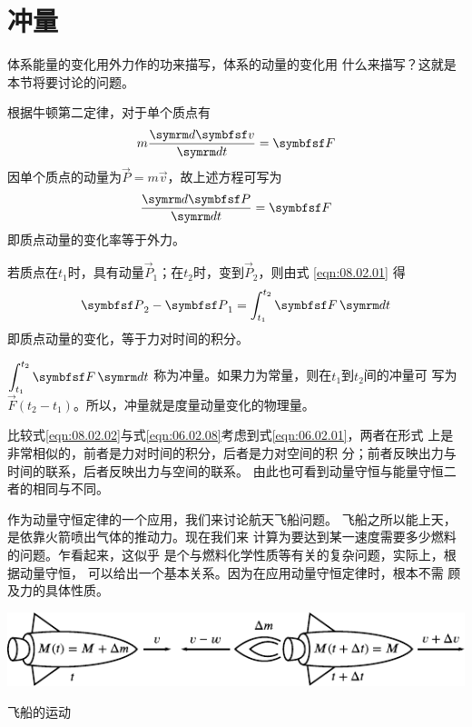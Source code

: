 \section[冲量]{冲\qquad 量}\label{sec:08.02}

体系能量的变化用外力作的功来描写，体系的动量的变化用
什么来描写？这就是本节将要讨论的问题。

根据牛顿第二定律，对于单个质点有
\begin{equation*}
  m \frac { \dif \vec{v} } { \dif t } = \vec{F}
\end{equation*}
因单个质点的动量为$  \vec{P} = m \vec{v}   $，故上述方程可写为
\begin{equation}\label{eqn:08.02.01}
  \frac { \dif \vec{P} } { \dif t } = \vec{F}
\end{equation}
即质点动量的变化率等于外力。

若质点在$  t _ { 1 }   $时，具有动量$\vec{P} _ 1$；在$ t _ { 2 } $时，变到$\vec{P} _ 2$，则由式 \eqref{eqn:08.02.01}
得
\begin{equation}\label{eqn:08.02.02}
  \vec{P} _ { 2 } - \vec{P} _ { 1 } = \int _ { t _ { 1 } } ^ { t _ { 2 } } \vec{F} \dif t
\end{equation}
即质点动量的变化，等于力对时间的积分。

$ \displaystyle \int _ { t _ { 1 } } ^ { t _ { 2 } } \vec{F} \dif t $
称为冲量。如果力为常量，则在$ t_1 $到$ t_2 $间的冲量可
写为$  \vec{F} \left( t _ { 2 } - t _ { 1 } \right) $。所以，冲量就是度量动量变化的物理量。

\clearpage
比较式\eqref{eqn:08.02.02}与式\eqref{eqn:06.02.08}\lhbrak 考虑到式\eqref{eqn:06.02.01}\rhbrak ，两者在形式
上是非常相似的，前者是力对时间的积分，后者是力对空间的积
分；前者反映出力与时间的联系，后者反映出力与空间的联系。
由此也可看到动量守恒与能量守恒二者的相同与不同。

作为动量守恒定律的一个应用，我们来讨论航天飞船问题。
飞船之所以能上天，是依靠火箭喷出气体的推动力。现在我们来
计算为要达到某一速度需要多少燃料的问题。乍看起来，这似乎
是个与燃料化学性质等有关的复杂问题，实际上，根据动量守恒，
可以给出一个基本关系。因为在应用动量守恒定律时，根本不需
顾及力的具体性质。

\begin{figurex}
  \centering
  \includegraphics{figure/fig08.04}
  \caption{飞船的运动}
  \label{fig:08.04}
\end{figurex}

